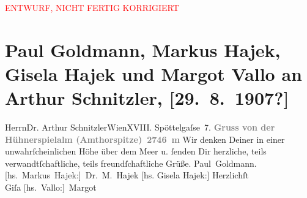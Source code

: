 
\begin{center}
            \textcolor{red}{ENTWURF, NICHT FERTIG KORRIGIERT}
                      \end{center}
            
         \renewcommand{\erwaehnteOrte}{Orte: Carezza, Edmund-Weiß-Gasse, Gossensass, Hühnerspiel, Wien}
         \renewcommand{\erwaehnteWerke}{}
               \section[Paul Goldmann, Markus Hajek, Gisela Hajek und Margot Vallo an Arthur Schnitzler, {[}29. 8. 1907?{]}]{ Paul Goldmann, Markus Hajek, Gisela Hajek und Margot Vallo an Arthur
               Schnitzler, {[}29. 8. 1907?{]}}\nopagebreak{}\rehead{ }\begin{ledgroupsized}[t]{13cm}\normalsize\beginnumbering \toendnotes[C]{\smallbreak\pagebreak[2]} 
\pstart{}{\pb}Herrn\pend{}\pstart{}Dr. Arthur Schnitzler\pend{}\pstart{}Wien\pend{}\pstart{}XVIII. Spöttelgaſse 7.\pend{}{\bigskip}\pstart
           \noindent{}{\pb}\textcolor{gray}{\textbf{Gruss von der Hühnerspielalm (Amthorspitze) 2746 m}}\pend
           \pstart
           {\pb}Wir denken Deiner in einer unwahrſcheinlichen Höhe
               über dem Meer u. ſenden Dir herzliche, teils verwandtſchaftliche, teils
               freundſchaftliche Grüße. \spacefill\mbox{Paul Goldmann.}\pend
           \pstart
           \spacefill\mbox{{[}hs. Markus Hajek:{]} Dr. M. Hajek}\pend
           \pstart
           {[}hs. Gisela Hajek:{]} Herzlichſt {\\}\spacefill\mbox{Giſa}\pend
           \pstart
           \spacefill\mbox{{[}hs. Vallo:{]} Margot}\pend
           
         
         \endnumbering{}\end{ledgroupsized}\begin{anhang}\end{anhang}\newcommand{\dateiname}{L03459}\newcommand{\titel}{Paul Goldmann, Markus Hajek, Gisela Hajek und Margot Vallo an Arthur Schnitzler, [29. 8. 1907?]}\newcommand{\editorInnen}{Martin Anton Müller und Laura Untner}
      